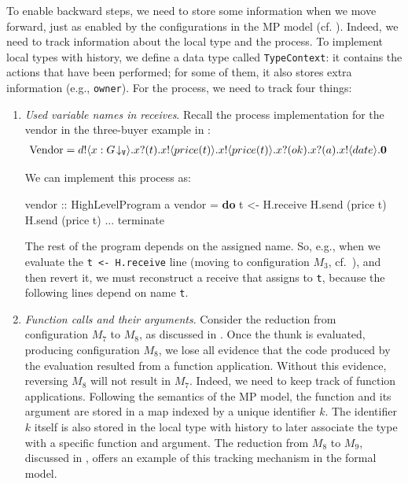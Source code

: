 \documentclass[runningheads,plain]{llncs}
\newenvironment{Shaded}{}{}
\newcommand{\KeywordTok}[1]{\textcolor[rgb]{0.00,0.44,0.13}{\textbf{#1}}}
\newcommand{\DataTypeTok}[1]{\textcolor[rgb]{0.56,0.13,0.00}{#1}}
\newcommand{\OtherTok}[1]{\textcolor[rgb]{0.00,0.44,0.13}{#1}}
\newcommand{\FunctionTok}[1]{\textcolor[rgb]{0.02,0.16,0.49}{#1}}
\newcommand{\NormalTok}[1]{#1}
\begin{document}
To enable backward steps, we need to store some information when we move forward, just as enabled by the configurations in the MP model (cf. ).
Indeed, we need to track information about the local type and the process.
To implement local types with history, we define a data type called \texttt{TypeContext}: it
contains the actions that have been performed; for some of them, it also
stores extra information (e.g., \texttt{owner}).
For the process, we need to track four things:

\begin{enumerate}[1.]
\def\labelenumi{\arabic{enumi}.}
\item \emph{Used variable names in receives}.
    Recall the process implementation for  the vendor in the three-buyer example in :
  \begin{align*}
  \text{Vendor} & =  d ! \langle x:G\!\downarrow_{\mathtt{V}} \rangle .x ? (t) .x ! \langle price(t) \rangle .x ! \langle price(t) \rangle . x ? (ok) .x ? (a) . x ! \langle date \rangle .\mathbf{0}
  \end{align*}

We can implement this process as:
\begin{Shaded}
\begin{Highlighting}[]
\OtherTok{vendor ::} \DataTypeTok{HighLevelProgram}\NormalTok{ a}
\NormalTok{vendor }\FunctionTok{=} \KeywordTok{do} 
\NormalTok{    t }\OtherTok{<-}\NormalTok{ H.receive }
\NormalTok{    H.send (price t) }
\NormalTok{    H.send (price t) }
    \FunctionTok{...}
\NormalTok{    terminate}
\end{Highlighting}
\end{Shaded}
  The rest of the program depends on the assigned name. So, e.g.,
  when we evaluate the \texttt{t\ \textless{}-\ H.receive} line
  (moving to configuration \(M_3\), cf.~), and then revert it, we must
  reconstruct a receive that assigns to \texttt{t}, because the
  following lines depend on   name \texttt{t}. \\

\item \emph{Function calls and their arguments}.
      Consider the reduction from configuration $M_7$ to $M_8$, as discussed in . Once the thunk
  is evaluated, producing configuration \(M_8\), we lose all evidence that the
  code produced by the evaluation  resulted from a function
  application. 
  Without this evidence, reversing $M_8$ will
  not result in $M_7$. Indeed, we need to keep track of function
  applications. 
  Following the semantics of the MP model, 
  the function and its argument are stored in a map
  indexed by a unique identifier $k$. The identifier $k$ itself is also
  stored in the local type with history to later associate the type with
  a specific function and argument.
  The reduction from $M_8$ to $M_9$, discussed in , offers an example of this tracking mechanism in the formal model.


\end{enumerate}
\end{document}
